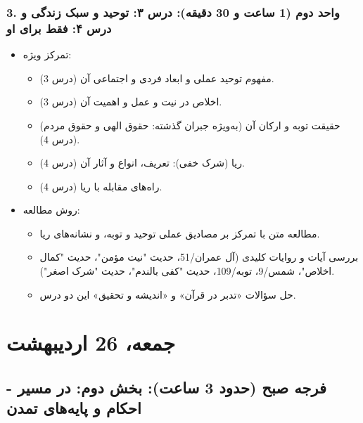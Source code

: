 \documentclass{article}
\begin{document}
\subsubsection*{3. واحد دوم (1 ساعت و 30 دقیقه): درس ۳: توحید و سبک زندگی و درس ۴: فقط برای او}
\begin{itemize}
    \item تمرکز ویژه:
    \begin{itemize}
        \item مفهوم توحید عملی و ابعاد فردی و اجتماعی آن (درس 3).
        \item اخلاص در نیت و عمل و اهمیت آن (درس 3).
        \item حقیقت توبه و ارکان آن (به‌ویژه جبران گذشته: حقوق الهی و حقوق مردم) (درس 4).
        \item ریا (شرک خفی): تعریف، انواع و آثار آن (درس 4).
        \item راه‌های مقابله با ریا (درس 4).
    \end{itemize}
    \item روش مطالعه:
    \begin{itemize}
        \item مطالعه متن با تمرکز بر مصادیق عملی توحید و توبه، و نشانه‌های ریا.
        \item بررسی آیات و روایات کلیدی (آل عمران/51، حدیث "نیت مؤمن"، حدیث "کمال اخلاص"، شمس/9، توبه/109، حدیث "کفی بالندم"، حدیث "شرک اصغر").
        \item حل سؤالات «تدبر در قرآن» و «اندیشه و تحقیق» این دو درس.
    \end{itemize}
\end{itemize}

\bigskip
\hrulefill
\bigskip

\section*{جمعه، 26 اردیبهشت}

\subsection*{فرجه صبح (حدود 3 ساعت): بخش دوم: در مسیر - احکام و پایه‌های تمدن}
\end{document}
